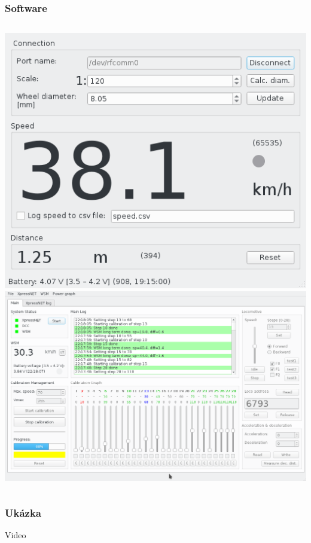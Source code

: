 \documentclass[aspectratio=169]{beamer}
\begin{document}

\begin{frame}
\frametitle{Software}
\begin{columns}[t]
	\includegraphics[align=c,width=\columnwidth]{data/speed_reader_screenshot.png}
	\pause
	\includegraphics[align=c,width=\columnwidth]{data/ac_progress.png}
\end{columns}
\end{frame}


\begin{frame}
\frametitle{Ukázka}
Video
\end{frame}
\end{document}
